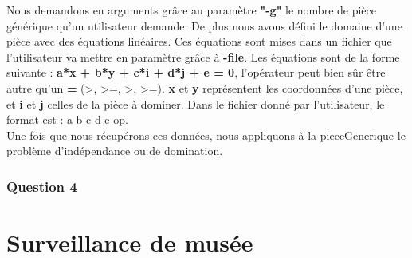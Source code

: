\documentclass{article}
\begin{document}
Nous demandons en arguments grâce au paramètre \textbf{"-g"} le nombre de pièce générique qu'un utilisateur demande. De plus nous avons défini le domaine d'une pièce avec des équations linéaires. Ces équations sont mises dans un fichier que l'utilisateur va mettre en paramètre grâce à \textbf{-file}. Les équations sont de la forme suivante : \textbf{a*x + b*y + c*i + d*j + e = 0}, l'opérateur peut bien sûr être autre qu'un \textbf{=} (>, >=, >, >=). \textbf{x} et \textbf{y} représentent les coordonnées d'une pièce, et \textbf{i} et \textbf{j} celles de la pièce à dominer. Dans le fichier donné par l'utilisateur, le format est : a b c d e op. \\

Une fois que nous récupérons ces données, nous appliquons à la pieceGenerique le problème d'indépendance ou de domination. 

\subsubsection{Question 4}

\section{Surveillance de musée}
\end{document}
